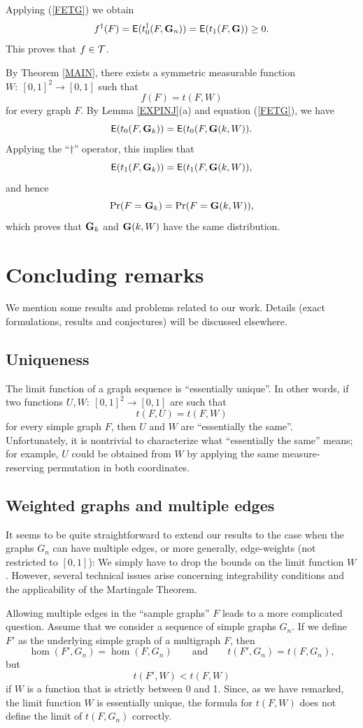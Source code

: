 \documentclass[fleqn]{article}
\begin{document}
Applying (\ref{FETG}) we obtain
\[
f^\dagger(F) = {\sf E}(t_0^\dagger(F,{\mathbf G}_n)) = {\sf E}(t_1(F,{\mathbf G})) \ge 0.
\]
This proves that $f\in {\cal T}$.

By Theorem \ref{MAIN}, there exists a symmetric measurable function
$W:~[0,1]^2\to[0,1]$ such that
\[
f(F)=t(F,W)
\]
for every graph $F$. By Lemma \ref{EXPINJ}(a) and equation
(\ref{FETG}), we have
\[
{\sf E}(t_0(F,{\mathbf G}_k))={\sf E}(t_0(F,{\mathbf G}(k,W)).
\]
Applying the ``$\dagger$'' operator, this implies that
\[
{\sf E}(t_1(F,{\mathbf G}_k))={\sf E}(t_1(F,{\mathbf G}(k,W)),
\]
and hence
\[
\Pr(F={\mathbf G}_k)=\Pr(F={\mathbf G}(k,W)),
\]
which proves that ${\mathbf G}_k$ and ${\mathbf G}(k,W)$ have the same distribution.

\section{Concluding remarks}

We mention some results and problems related to our work. Details
(exact formulations, results and conjectures) will be discussed
elsewhere.

\subsection{Uniqueness}

The limit function of a graph sequence is ``essentially unique''. In
other words, if two functions $U,W:~[0,1]^2\to[0,1]$ are such that
\[
t(F,U)=t(F,W)
\]
for every simple graph $F$, then $U$ and $W$ are ``essentially the
same''. Unfortunately, it is nontrivial to characterize what
``essentially the same'' means; for example, $U$ could be obtained
from $W$ by applying the same measure-reserving permutation in both
coordinates.

\subsection{Weighted graphs and multiple edges}\label{EXTENSIONS}

It seems to be quite straightforward to extend our results to the
case when the graphs $G_n$ can have multiple edges, or more
generally, edge-weights (not restricted to $[0,1]$): We simply have
to drop the bounds on the limit function $W$. However, several
technical issues arise concerning integrability conditions and the
applicability of the Martingale Theorem.

Allowing multiple edges in the ``sample graphs'' $F$ leads to a more
complicated question. Assume that we consider a sequence of simple
graphs $G_n$. If we define $F'$ as the underlying simple graph of a
multigraph $F$, then
\[
\hom(F',G_n)=\hom(F,G_n)\qquad \text{and}\qquad t(F',G_n)=t(F,G_n),
\]
but
\[
t(F',W)<t(F,W)
\]
if $W$ is a function that is strictly between 0 and 1. Since, as we
have remarked, the limit function $W$ is essentially unique, the
formula for $t(F,W)$ does not define the limit of $t(F,G_n)$
correctly.
\end{document}
